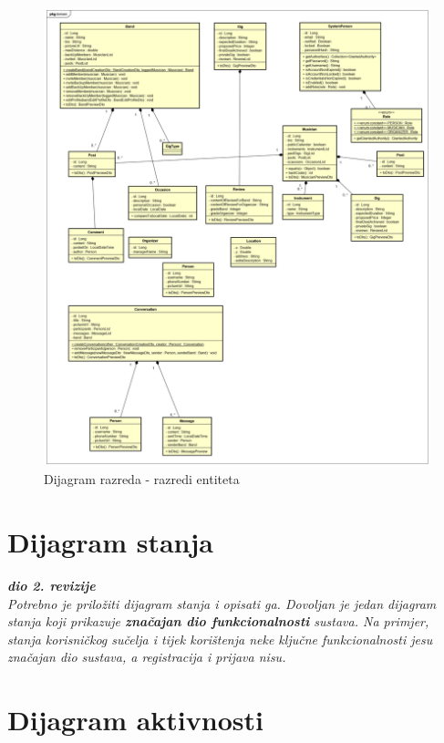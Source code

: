 		\begin{figure}[H]
			\begin{center}
				\includegraphics[width=17cm]{slike/domena.PNG}
			\end{center}
			\caption{Dijagram razreda - razredi entiteta}
			\label{fig:domena}
		\end{figure}
		
		\section{Dijagram stanja}
			
			
			\textbf{\textit{dio 2. revizije}}\\
			
			\textit{Potrebno je priložiti dijagram stanja i opisati ga. Dovoljan je jedan dijagram stanja koji prikazuje \textbf{značajan dio funkcionalnosti} sustava. Na primjer, stanja korisničkog sučelja i tijek korištenja neke ključne funkcionalnosti jesu značajan dio sustava, a registracija i prijava nisu. }
			
			
			\eject 
		
		\section{Dijagram aktivnosti}
			

